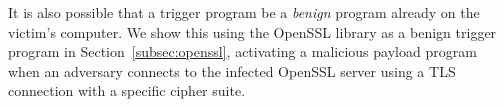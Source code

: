 %
%








It is also possible that a trigger program be a
\emph{benign} program already on the victim's computer. We
show this using the OpenSSL library as a benign trigger
program in Section~\ref{subsec:openssl}, activating a malicious payload program
when an adversary connects to the infected OpenSSL server using a
TLS connection with a specific cipher suite.


